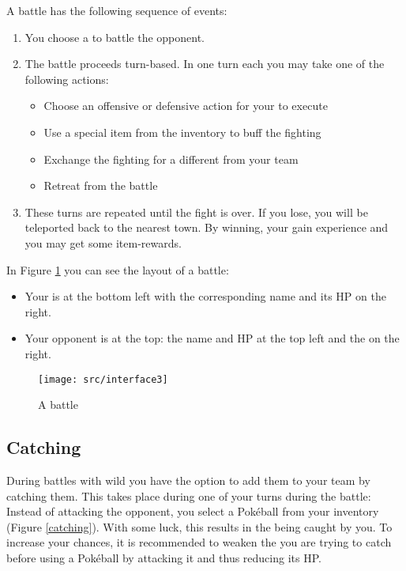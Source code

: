 A battle has the following sequence of events:
\begin{enumerate}
\item You choose a \poke{} to battle the opponent.
\item The battle proceeds turn-based. In one turn each you may take one of the following actions:
\begin{itemize}
\item Choose an offensive or defensive action for your \poke{} to execute
\item Use a special item from the inventory to buff the fighting \poke{}
\item Exchange the fighting \poke{} for a different \poke{} from your team
\item Retreat from the battle
\end{itemize}
\item These turns are repeated until the fight is over. If you lose, you will be teleported back to the nearest town. By winning, your \poke{} gain experience and you may get some item-rewards.
\end{enumerate}

In Figure \ref{battle} you can see the layout of a battle:
\begin{itemize}
\item Your \poke{} is at the bottom left with the corresponding name and its HP on the right.
\item Your opponent is at the top: the name and HP at the top left and the \poke{} on the right.
\end{itemize}

\begin{figure}[!ht]
\begin{center}
\texttt{[image: src/interface3]}
\end{center}
\caption[A \pokeT{} battle]{A \poke{} battle}
\label{battle}
\end{figure}

\newpage

\subsection[Catching \pokeT{}]{Catching \poke{}}
During battles with wild \poke{} you have the option to add them to your team by catching them. This takes place during one of your turns during the battle: Instead of attacking the opponent, you select a Pokéball from your inventory (Figure \ref{catching}). With some luck, this results in the \poke{} being caught by you. To increase your chances, it is recommended to weaken the \poke{} you are trying to catch before using a Pokéball by attacking it and thus reducing its HP.

